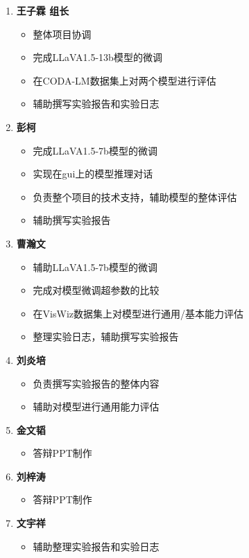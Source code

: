 \documentclass[
    linespread = 1.25
]{ctexart}
\begin{document}
\begin{enumerate}
  \item \textbf{王子霖 \space 组长}
        \begin{itemize}
          \item 整体项目协调
          \item 完成LLaVA1.5-13b模型的微调
          \item 在CODA-LM数据集上对两个模型进行评估
          \item 辅助撰写实验报告和实验日志
        \end{itemize}

  \item \textbf{彭柯}
        \begin{itemize}
          \item 完成LLaVA1.5-7b模型的微调
          \item 实现在gui上的模型推理对话
          \item 负责整个项目的技术支持，辅助模型的整体评估
          \item 辅助撰写实验报告
        \end{itemize}

  \item \textbf{曹瀚文}
        \begin{itemize}
          \item 辅助LLaVA1.5-7b模型的微调
          \item 完成对模型微调超参数的比较
          \item 在VisWiz数据集上对模型进行通用/基本能力评估
          \item 整理实验日志，辅助撰写实验报告
        \end{itemize}

  \item \textbf{刘炎培}
        \begin{itemize}
          \item 负责撰写实验报告的整体内容
          \item 辅助对模型进行通用能力评估
        \end{itemize}

  \item \textbf{金文韬}
        \begin{itemize}
          \item 答辩PPT制作
        \end{itemize}
  \item \textbf{刘梓涛}
        \begin{itemize}
          \item 答辩PPT制作
        \end{itemize}
  \item \textbf{文宇祥}
        \begin{itemize}
          \item 辅助整理实验报告和实验日志
        \end{itemize}

\end{enumerate}



\end{document}
